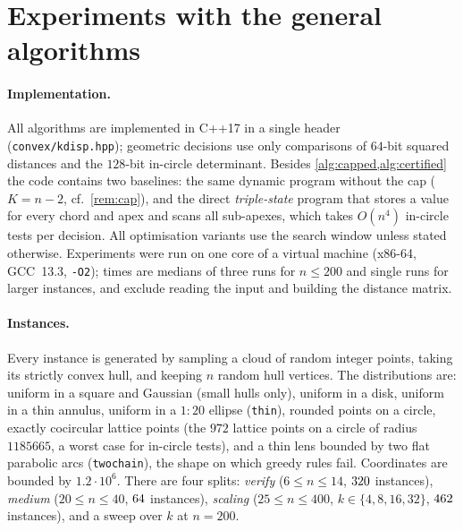 \documentclass[11pt,a4paper]{article}
\theoremstyle{definition}
\theoremstyle{remark}
\newcommand{\code}[1]{\nolinkurl{#1}}
\begin{document}
\appendix
\section{Experiments with the general algorithms}\label{sec:experiments}

\paragraph{Implementation.}
All algorithms are implemented in C++17 in a single header
(\code{convex/kdisp.hpp}); geometric decisions use only comparisons of $64$-bit
squared distances and the $128$-bit in-circle determinant. Besides
\cref{alg:capped,alg:certified} the code contains two baselines: the same
dynamic program without the cap ($K=n-2$, cf.\ \cref{rem:cap}), and the direct
\emph{triple-state} program that stores a value for every chord and apex and
scans all sub-apexes, which takes $O(n^4)$ in-circle tests per decision. All
optimisation variants use the search window unless stated otherwise.
Experiments were run on one core of a virtual machine (x86-64, GCC~13.3,
\code{-O2}); times are medians of three runs for $n\le200$ and single runs
for larger instances, and exclude reading the input and building the distance
matrix.

\paragraph{Instances.}
Every instance is generated by sampling a cloud of random integer points,
taking its strictly convex hull, and keeping $n$ random hull vertices. The
distributions are: uniform in a square and Gaussian (small hulls only),
uniform in a disk, uniform in a thin annulus, uniform in a $1{:}20$ ellipse
(\code{thin}), rounded points on a circle, exactly cocircular lattice points
(the $972$ lattice points on a circle of radius $1185665$, a worst case for
in-circle tests), and a thin lens bounded by two flat parabolic arcs
(\code{twochain}), the shape on which greedy rules fail. Coordinates are
bounded by $1.2\cdot10^{6}$. There are four splits: \emph{verify}
($6\le n\le14$, $320$ instances), \emph{medium} ($20\le n\le40$,
$64$ instances), \emph{scaling} ($25\le n\le400$, $k\in\{4,8,16,32\}$,
$462$ instances), and a sweep over $k$ at $n=200$.
\end{document}
